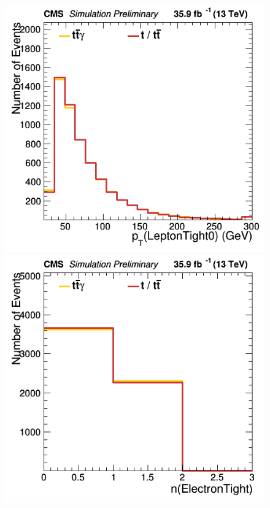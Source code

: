 \documentclass[11pt]{scrartcl}
\begin{document}
	\begin{figure}[H]
	\centering
	\begin{minipage}{.5\textwidth}
	  \centering
	  \includegraphics[width=0.75\linewidth]{figures/Notused/LeptonTight0_pt.png}
	\end{minipage}%
	\begin{minipage}{.5\textwidth}
	  \centering
	  \includegraphics[width=0.75\linewidth]{figures/Notused/nElectronTight.png}
	\end{minipage}
	\end{figure}
	
\end{document}
